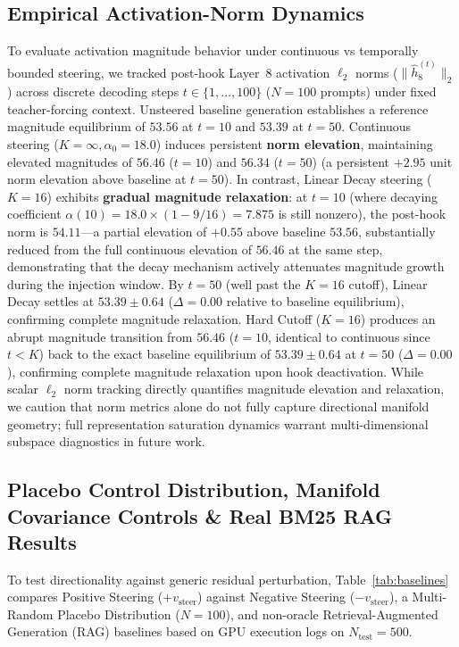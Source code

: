 \subsection{Empirical Activation-Norm Dynamics}
To evaluate activation magnitude behavior under continuous vs temporally bounded steering, we tracked post-hook Layer~8 activation $\ell_2$ norms ($\|\hat{h}_8^{(t)}\|_2$) across discrete decoding steps $t \in \{1, \ldots, 100\}$ ($N=100$ prompts) under fixed teacher-forcing context. Unsteered baseline generation establishes a reference magnitude equilibrium of $53.56$ at $t=10$ and $53.39$ at $t=50$. Continuous steering ($K=\infty, \alpha_0=18.0$) induces persistent \textbf{norm elevation}, maintaining elevated magnitudes of $56.46$ ($t=10$) and $56.34$ ($t=50$) (a persistent $+2.95$ unit norm elevation above baseline at $t=50$). In contrast, Linear Decay steering ($K=16$) exhibits \textbf{gradual magnitude relaxation}: at $t=10$ (where decaying coefficient $\alpha(10) = 18.0 \times (1 - 9/16) = 7.875$ is still nonzero), the post-hook norm is $54.11$---a partial elevation of $+0.55$ above baseline $53.56$, substantially reduced from the full continuous elevation of $56.46$ at the same step, demonstrating that the decay mechanism actively attenuates magnitude growth during the injection window. By $t=50$ (well past the $K=16$ cutoff), Linear Decay settles at $53.39 \pm 0.64$ ($\Delta = 0.00$ relative to baseline equilibrium), confirming complete magnitude relaxation. Hard Cutoff ($K=16$) produces an abrupt magnitude transition from $56.46$ ($t=10$, identical to continuous since $t < K$) back to the exact baseline equilibrium of $53.39 \pm 0.64$ at $t=50$ ($\Delta = 0.00$), confirming complete magnitude relaxation upon hook deactivation. While scalar $\ell_2$ norm tracking directly quantifies magnitude elevation and relaxation, we caution that norm metrics alone do not fully capture directional manifold geometry; full representation saturation dynamics warrant multi-dimensional subspace diagnostics in future work.

\subsection{Placebo Control Distribution, Manifold Covariance Controls \& Real BM25 RAG Results}
To test directionality against generic residual perturbation, Table~\ref{tab:baselines} compares Positive Steering ($+v_{\text{steer}}$) against Negative Steering ($-v_{\text{steer}}$), a Multi-Random Placebo Distribution ($N=100$), and non-oracle Retrieval-Augmented Generation (RAG) baselines based on GPU execution logs on $N_{\text{test}}=500$.

